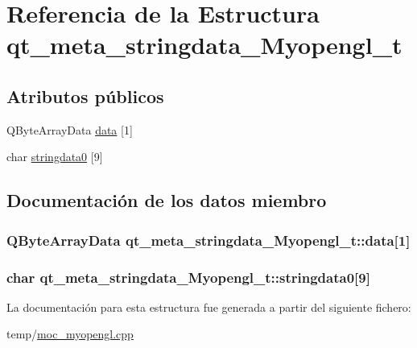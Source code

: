 \hypertarget{structqt__meta__stringdata___myopengl__t}{}\section{Referencia de la Estructura qt\+\_\+meta\+\_\+stringdata\+\_\+\+Myopengl\+\_\+t}
\label{structqt__meta__stringdata___myopengl__t}
\subsection*{Atributos públicos}
\begin{DoxyCompactItemize}
\item 
Q\+Byte\+Array\+Data \hyperlink{structqt__meta__stringdata___myopengl__t_a1ae20694dffa1356fb71f06654cabb1e}{data} \mbox{[}1\mbox{]}
\item 
char \hyperlink{structqt__meta__stringdata___myopengl__t_af6dd80cdfcbe53bd8e65f535a330a8fc}{stringdata0} \mbox{[}9\mbox{]}
\end{DoxyCompactItemize}


\subsection{Documentación de los datos miembro}
\subsubsection[{\texorpdfstring{data}{data}}]{\setlength{\rightskip}{0pt plus 5cm}Q\+Byte\+Array\+Data qt\+\_\+meta\+\_\+stringdata\+\_\+\+Myopengl\+\_\+t\+::data\mbox{[}1\mbox{]}}\hypertarget{structqt__meta__stringdata___myopengl__t_a1ae20694dffa1356fb71f06654cabb1e}{}\label{structqt__meta__stringdata___myopengl__t_a1ae20694dffa1356fb71f06654cabb1e}
\subsubsection[{\texorpdfstring{stringdata0}{stringdata0}}]{\setlength{\rightskip}{0pt plus 5cm}char qt\+\_\+meta\+\_\+stringdata\+\_\+\+Myopengl\+\_\+t\+::stringdata0\mbox{[}9\mbox{]}}\hypertarget{structqt__meta__stringdata___myopengl__t_af6dd80cdfcbe53bd8e65f535a330a8fc}{}\label{structqt__meta__stringdata___myopengl__t_af6dd80cdfcbe53bd8e65f535a330a8fc}


La documentación para esta estructura fue generada a partir del siguiente fichero\+:\begin{DoxyCompactItemize}
\item 
temp/\hyperlink{moc__myopengl_8cpp}{moc\+\_\+myopengl.\+cpp}\end{DoxyCompactItemize}
